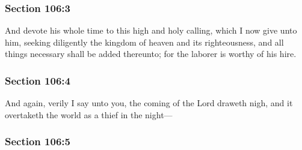 
	\subsubsection{Section 106:3} %
		\label{DC106-3}

		And devote his whole time to this high and holy calling, which I now give unto him, seeking diligently the kingdom of heaven and its righteousness, and all things necessary shall be added thereunto; for the laborer is worthy of his hire.


	\subsubsection{Section 106:4} %
		\label{DC106-4}

		And again, verily I say unto you, the coming of the Lord draweth nigh, and it overtaketh the world as a thief in the night—


	\subsubsection{Section 106:5} %
		\label{DC106-5}

